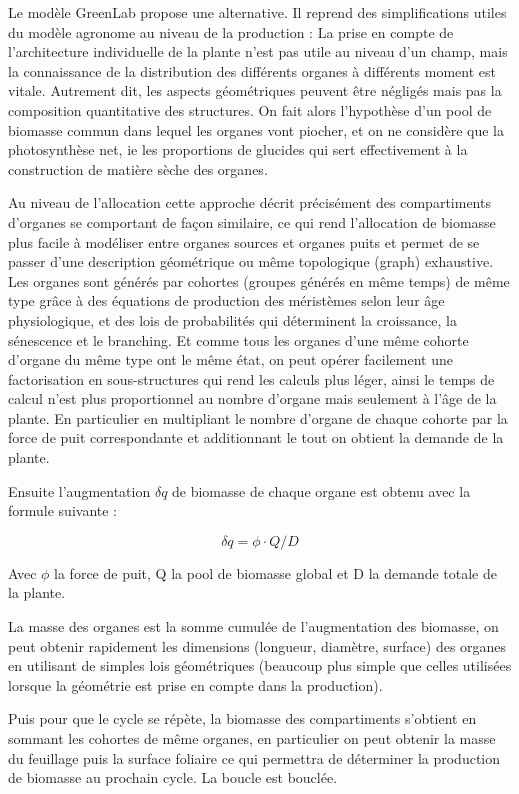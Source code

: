 {Le modèle GreenLab propose une alternative. Il reprend des simplifications utiles du modèle agronome au niveau de la production : La prise en compte de l’architecture individuelle de la plante n’est pas utile au niveau d’un champ, mais la connaissance de la distribution des différents organes à différents moment est vitale. Autrement dit, les aspects géométriques peuvent être négligés mais pas la composition quantitative des structures. On fait alors l’hypothèse d’un pool de biomasse commun dans lequel les organes vont piocher, et on ne considère que la photosynthèse net, ie les proportions de glucides qui sert effectivement à la construction de matière sèche des organes. 

Au niveau de l’allocation cette approche décrit précisément des compartiments d’organes se comportant de façon similaire, ce qui rend l’allocation de biomasse plus facile à modéliser entre organes sources et organes puits et permet de se passer d’une description géométrique ou même topologique (graph) exhaustive. Les organes sont générés par cohortes (groupes générés en même temps) de même type grâce à des équations de production des méristèmes selon leur âge physiologique, et des lois de probabilités qui déterminent la croissance, la sénescence et le branching. Et comme tous les organes d’une même cohorte d’organe du même type ont le même état, on peut opérer facilement une factorisation en sous-structures qui rend les calculs plus léger, ainsi le temps de calcul n’est plus proportionnel au nombre d’organe mais seulement à l’âge de la plante. En particulier en multipliant le nombre d’organe de chaque cohorte par la force de puit correspondante et additionnant le tout on obtient la demande de la plante.

Ensuite l’augmentation $\delta q$ de biomasse de chaque organe est obtenu avec la formule suivante :

\[ \delta q = \phi \cdot Q/D \]

Avec $\phi$ la force de puit, Q la pool de biomasse global et D la demande totale de la plante.

La masse des organes est la somme cumulée de l’augmentation des biomasse, on peut obtenir rapidement les dimensions (longueur, diamètre, surface) des organes en utilisant de simples lois géométriques (beaucoup plus simple que celles utilisées lorsque la géométrie est prise en compte dans la production). 

Puis pour que le cycle se répète, la biomasse des compartiments s’obtient  en sommant les cohortes de même organes, en particulier on peut obtenir la masse du feuillage puis la surface foliaire ce qui permettra de déterminer la production de biomasse au prochain cycle. La boucle est bouclée.

}
